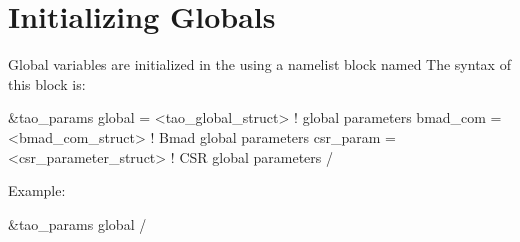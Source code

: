 {%
\section{Initializing Globals}
\label{s:globals} 

Global variables are initialized in the  using a
namelist block named  The syntax of this block is:
\begin{example}
  &tao_params
    global        = <tao_global_struct>     ! global parameters
    bmad_com      = <bmad_com_struct>       ! Bmad global parameters
    csr_param     = <csr_parameter_struct>  ! CSR global parameters
  /
\end{example}
Example:
\begin{example}
  &tao_params
    global%
  /
\end{example}

}

